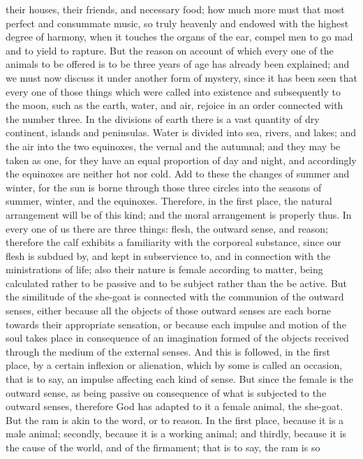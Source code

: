 their houses, their friends, and necessary food; how much more must that most perfect and
consummate music, so truly heavenly and endowed with the highest degree of harmony, when it
touches the organs of the ear, compel men to go mad and to yield to rapture. But the reason on
account of which every one of the animals to be offered is to be three years of age has already
been explained; and we must now discuss it under another form of mystery, since it has been seen
that every one of those things which were called into existence and subsequently to the moon,
such as the earth, water, and air, rejoice in an order connected with the number three. In the
divisions of earth there is a vast quantity of dry continent, islands and peninsulas. Water is divided
into sea, rivers, and lakes; and the air into the two equinoxes, the vernal and the autumnal; and
they may be taken as one, for they have an equal proportion of day and night, and accordingly the
equinoxes are neither hot nor cold. Add to these the changes of summer and winter, for the sun is
borne through those three circles into the seasons of summer, winter, and the equinoxes.
Therefore, in the first place, the natural arrangement will be of this kind; and the moral arrangement
is properly thus. In every one of us there are three things: flesh, the outward sense, and reason;
therefore the calf exhibits a familiarity with the corporeal substance, since our flesh is subdued by,
and kept in subservience to, and in connection with the ministrations of life; also their nature is
female according to matter, being calculated rather to be passive and to be subject rather than the
be active. But the similitude of the she-goat is connected with the communion of the outward
senses, either because all the objects of those outward senses are each borne towards their
appropriate sensation, or because each impulse and motion of the soul takes place in
consequence of an imagination formed of the objects received through the medium of the external
senses. And this is followed, in the first place, by a certain inflexion or alienation, which by some is
called an occasion, that is to say, an impulse affecting each kind of sense. But since the female is
the outward sense, as being passive on consequence of what is subjected to the outward senses,
therefore God has adapted to it a female animal, the she-goat. But the ram is akin to the word, or
to reason. In the first place, because it is a male animal; secondly, because it is a working animal;
and thirdly, because it is the cause of the world, and of the firmament; that is to say, the ram is so
